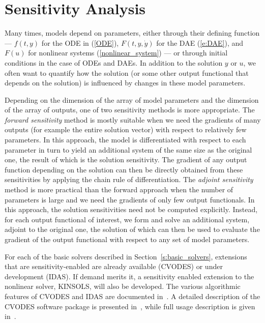 \section{Sensitivity Analysis}\label{s:sensitivity_analysis}

Many times, models depend on parameters, either through their defining
function --- $f(t,y)$ for the ODE in (\ref{ODE}), $F(t,y,{\dot y})$ for the DAE
(\ref{e:DAE}), and $F(u)$ for nonlinear systems (\ref{nonlinear_system}) 
--- or through initial conditions in the case of ODEs and DAEs. 
In addition to the solution $y$ or $u$, we often want to quantify how 
the solution (or some other output functional that depends on the solution) 
is influenced by changes in these model parameters.

Depending on the dimension of the array of model parameters and the
dimension of the array of outputs, one of two sensitivity methods
is more appropriate. 
%
The {\em forward sensitivity} method is mostly suitable when we need 
the gradients of many outputs (for example the entire solution vector) 
with respect to relatively few parameters.
In this approach, the model is differentiated with respect to each 
parameter in turn to yield an additional system of the same size as
the original one, the result of which is the solution sensitivity.
The gradient of any output function depending on the solution can
then be directly obtained from these sensitivities by applying the
chain rule of differentiation.
%
The {\em adjoint sensitivity} method is more practical than
the forward approach when the number of parameters is large and
we need the gradients of only few output functionals.
In this approach, the solution sensitivities need not be computed
explicitly. Instead, for each output functional of interest, we form
and solve an additional system, adjoint to the original one, the 
solution of which can then be used to evaluate the gradient of the
output functional with respect to any set of model parameters.

For each of the basic solvers described in Section~\ref{s:basic_solvers},
extensions that are sensitivity-enabled are already available (CVODES)
or under development (IDAS). If demand merits it, a sensitivity
enabled extension to the nonlinear solver, KINSOLS, will also be
developed.
The various algorithmic features of CVODES and IDAS are documented 
in~\cite{CLPS:03}. A detailed description of the CVODES software package 
is presented in~\cite{SeHi:03}, while full usage description is given
in~\cite{HiSe:02}.
%

